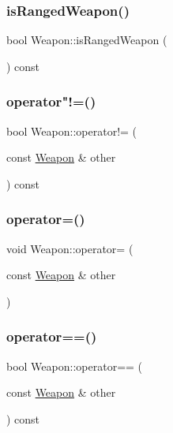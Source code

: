\mbox{\label{class_weapon_a05aac2a3ad6a6b173025eb66c20de924}} 
\subsubsection{\texorpdfstring{is\+Ranged\+Weapon()}{isRangedWeapon()}}
{\footnotesize\ttfamily bool Weapon\+::is\+Ranged\+Weapon (\begin{DoxyParamCaption}{ }\end{DoxyParamCaption}) const}

\mbox{\label{class_weapon_a3e7097112f2e3e2eff39469af5d610d6}} 
\subsubsection{\texorpdfstring{operator"!=()}{operator!=()}}
{\footnotesize\ttfamily bool Weapon\+::operator!= (\begin{DoxyParamCaption}\item[{const \mbox{\hyperlink{class_weapon}{Weapon}} \&}]{other }\end{DoxyParamCaption}) const}

\mbox{\label{class_weapon_a9a4297ad2057a660e2a7bd2c690f1ada}} 
\subsubsection{\texorpdfstring{operator=()}{operator=()}}
{\footnotesize\ttfamily void Weapon\+::operator= (\begin{DoxyParamCaption}\item[{const \mbox{\hyperlink{class_weapon}{Weapon}} \&}]{other }\end{DoxyParamCaption})}

\mbox{\label{class_weapon_a775cb30927bd7d89b9666a1fd9f8ed5f}} 
\subsubsection{\texorpdfstring{operator==()}{operator==()}}
{\footnotesize\ttfamily bool Weapon\+::operator== (\begin{DoxyParamCaption}\item[{const \mbox{\hyperlink{class_weapon}{Weapon}} \&}]{other }\end{DoxyParamCaption}) const}

